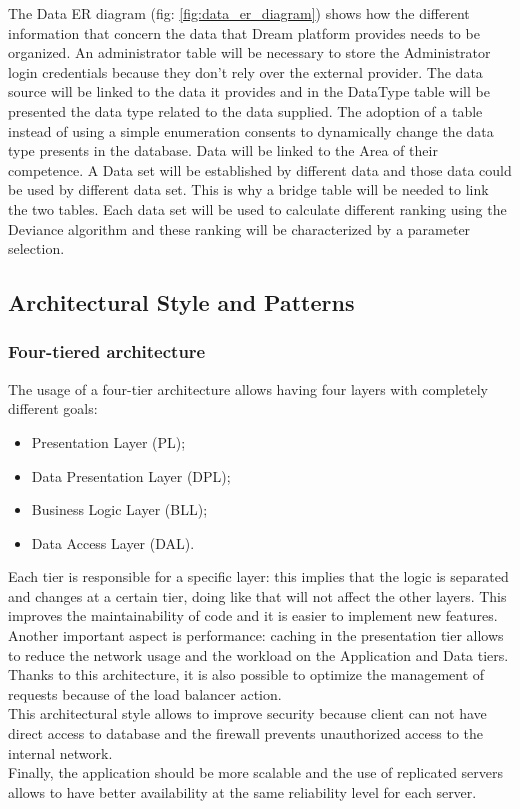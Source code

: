 The Data ER diagram (fig: \ref{fig:data_er_diagram}) shows how the different information that concern the data that Dream platform provides needs to be organized. An administrator table will be necessary to store the Administrator login credentials because they don't rely over the external provider.
The data source will be linked to the data it provides and in the DataType table will be presented the data type related to the data supplied. The adoption of a table instead of using a simple enumeration consents to dynamically change the data type presents in the database. Data will be linked to the Area of their competence.
A Data set will be established by different data and those data could be used by different data set. This is why a bridge table will be needed to link the two tables. Each data set will be used to calculate different ranking using the Deviance algorithm and these ranking will be characterized by a parameter selection. 


\subsection{Architectural Style and Patterns}
\subsubsection{Four-tiered architecture}
The usage of a four-tier architecture allows having four layers with completely different goals:
\begin{itemize}
    \item Presentation Layer (PL);
    \item Data Presentation Layer (DPL);
    \item Business Logic Layer (BLL);
    \item Data Access Layer (DAL).
\end{itemize}

Each tier is responsible for a specific layer: this implies that the logic is separated and changes at a certain tier, doing like that will not affect the other layers. This improves the maintainability of code and it is easier to implement new features.
\\Another important aspect is performance: caching in the presentation tier allows to reduce the network usage and the workload on the Application and Data tiers. Thanks to this architecture, it is also possible to optimize the management of requests because of the load balancer action. \\This architectural style allows to improve security because client can not have direct access to database and the firewall prevents unauthorized access to the internal network.\\ Finally, the application should be more scalable and the use of replicated servers allows to have better availability at the same reliability level for each server.

